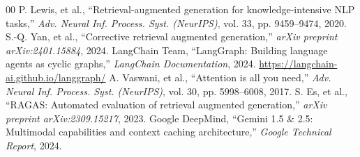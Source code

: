 \documentclass[11pt,a4paper]{article}
\begin{document}
\begin{thebibliography}{00}
 P. Lewis, et al., ``Retrieval-augmented generation for knowledge-intensive NLP tasks,'' \textit{Adv. Neural Inf. Process. Syst. (NeurIPS)}, vol. 33, pp. 9459--9474, 2020.
 S.-Q. Yan, et al., ``Corrective retrieval augmented generation,'' \textit{arXiv preprint arXiv:2401.15884}, 2024.
 LangChain Team, ``LangGraph: Building language agents as cyclic graphs,'' \textit{LangChain Documentation}, 2024. \url{https://langchain-ai.github.io/langgraph/}
 A. Vaswani, et al., ``Attention is all you need,'' \textit{Adv. Neural Inf. Process. Syst. (NeurIPS)}, vol. 30, pp. 5998--6008, 2017.
 S. Es, et al., ``RAGAS: Automated evaluation of retrieval augmented generation,'' \textit{arXiv preprint arXiv:2309.15217}, 2023.
 Google DeepMind, ``Gemini 1.5 \& 2.5: Multimodal capabilities and context caching architecture,'' \textit{Google Technical Report}, 2024.
\end{thebibliography}
\end{document}
